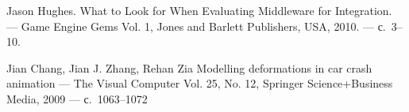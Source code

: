 \documentclass[a4paper,11pt]{report}
\begin{document}
\begin{thebibliography}{99}
      Jason Hughes.
      \newblock What to Look for When Evaluating Middleware for Integration.
      \newblock --- Game Engine Gems Vol. 1, Jones and Barlett Publishers, USA, 2010.
      \newblock --- с.~3--10.

      Jian Chang, Jian J. Zhang, Rehan Zia
      \newblock Modelling deformations in car crash animation
      \newblock --- The Visual Computer Vol. 25, No. 12, Springer Science+Business Media, 2009
      \newblock --- с.~1063--1072

  \end{thebibliography}
\end{document}

